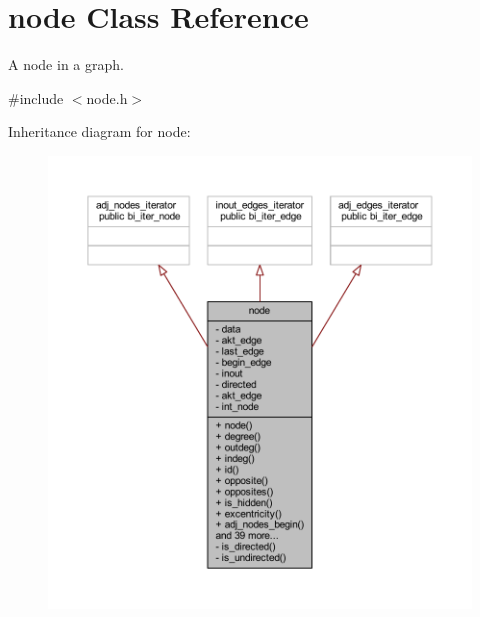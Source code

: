 \hypertarget{classnode}{}\section{node Class Reference}
\label{classnode}


A node in a graph.  




{\ttfamily \#include $<$node.\+h$>$}



Inheritance diagram for node\+:\nopagebreak
\begin{figure}[H]
\begin{center}
\leavevmode
\includegraphics[width=350pt]{classnode__inherit__graph}
\end{center}
\end{figure}


